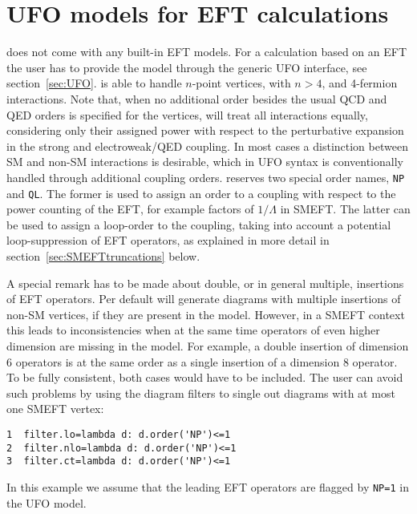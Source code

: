 \section{UFO models for EFT calculations}
\gosam does not come with any built-in EFT models. For a calculation based on an EFT the user has to provide the model through the generic UFO interface, see section~\ref{sec:UFO}. \gosam is able to handle $n$-point vertices, with $n>4$, and 4-fermion interactions. Note that, when no additional order besides the usual QCD and QED orders is specified for the vertices, \gosam will treat all interactions equally, considering only their assigned power with respect to the perturbative expansion in the strong and electroweak/QED coupling. In most cases a distinction between SM and non-SM interactions is desirable, which in UFO syntax is conventionally handled through additional coupling orders. \gosam reserves two special order names, \texttt{NP} and \texttt{QL}. The former is used to assign an order to a coupling with respect to the power counting of the EFT, for example factors of $1/\Lambda$ in SMEFT. The latter can be used to assign a loop-order to the coupling, taking into account a potential loop-suppression of EFT operators, as explained in more detail in section~\ref{sec:SMEFTtruncations} below.

A special remark has to be made about double, or in general multiple, insertions of EFT operators. Per default \gosam will generate diagrams with multiple insertions of non-SM vertices, if they are present in the model. However, in a SMEFT context this leads to inconsistencies when at the same time operators of even higher dimension are missing in the model. For example, a double insertion of dimension 6 operators is at the same order as a single insertion of a dimension 8 operator. To be fully consistent, both cases would have to be included. The user can avoid such problems by using the \python diagram filters to single out diagrams with at most one SMEFT vertex:
\begin{lstlisting}[gobble=3,style=py]
1  filter.lo=lambda d: d.order('NP')<=1
2  filter.nlo=lambda d: d.order('NP')<=1
3  filter.ct=lambda d: d.order('NP')<=1
\end{lstlisting}
In this example we assume that the leading EFT operators are flagged by \texttt{NP=1} in the UFO model.

